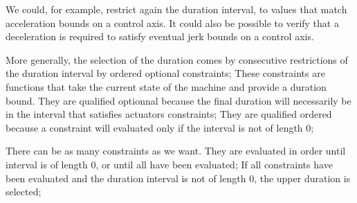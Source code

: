 We could, for example, restrict again the duration interval, to values that match acceleration bounds on a control
axis.
It could also be possible to verify that a deceleration is required to satisfy eventual jerk bounds on a control
axis.\newline

More generally, the selection of the duration comes by consecutive restrictions of the duration interval by ordered
optional constraints;
These constraints are functions that take the current state of the machine and provide a duration bound.
They are qualified optionnal because the final duration will necessarily be in the interval that satisfies actuators
constraints;
They are qualified ordered because a constraint will evaluated only if the interval is not of length 0;\newline

There can be as many constraints as we want. They are evaluated in order until interval is of length 0, or until
all have been evaluated;
If all constraints have been evaluated and the duration interval is not of length 0, the upper duration is selected;
\newline

